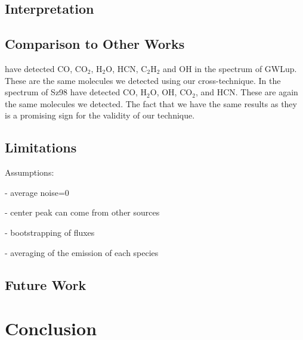 \documentclass[twoside, single, authoryear, semicolon]{lion-msc}
\newcommand{\4}{$_4$}
\newcommand{\3}{$_3$}
\newcommand{\2}{$_2$}
\begin{document}
\section{Interpretation}
\section{Comparison to Other Works}
\cite{Grant_2023} have detected CO, CO\2, H\2O, HCN, C\2H\2 and OH in the spectrum of GWLup. These are the same molecules we detected using our cross-technique. In the spectrum of Sz98 \cite{Gasman_2023} have detected CO, H\2O, OH, CO\2, and HCN. These are again the same molecules we detected. The fact that we have the same results as they is a promising sign for the validity of our technique. 
\section{Limitations}
Assumptions:

- average noise=0

- center peak can come from other sources

- bootstrapping of fluxes

- averaging of the emission of each species

\section{Future Work}



\chapter{Conclusion}\label{Ch: Conclusion}



\end{document}
